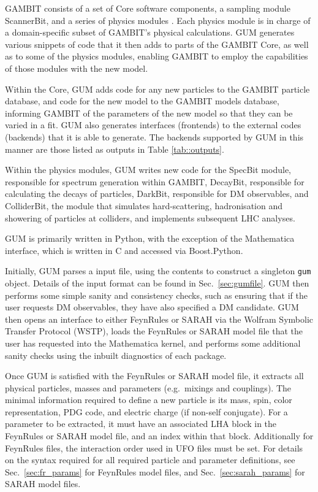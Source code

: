 \documentclass[pdftex,twocolumn,epjc3_preprint,runningheads]{svjour3}
\renewcommand{\_}{\discretionary{\underscore}{}{\underscore}}
\newcommand\term[1]{{\lstset{style=terminal}\lstinline!#1!\lstset{style=cpp}}}
\newcommand\py[1]{{\lstset{style=python}\lstinline!#1!\lstset{style=cpp}}}
\newcommand{\gambit}{\textsf{GAMBIT}\xspace}
\newcommand{\darkbit}{\textsf{DarkBit}\xspace}
\newcommand{\colliderbit}{\textsf{ColliderBit}\xspace}
\newcommand{\specbit}{\textsf{SpecBit}\xspace}
\newcommand{\decaybit}{\textsf{DecayBit}\xspace}
\newcommand{\scannerbit}{\textsf{ScannerBit}\xspace}
\newcommand{\GB}{\gambit}
\newcommand\Mathematica{\textsf{Mathematica}\xspace}
\newcommand{\gum}{\textsf{GUM}\xspace}
\newcommand{\dgum}{\!\!\term{.gum}\!\xspace}
\newcommand{\fr}{\textsf{FeynRules}\xspace}
\newcommand{\sarah}{\textsf{SARAH}\xspace}
\newcommand{\ufo}{\textsf{UFO}\xspace}
\newcommand\xx{\raisebox{0.2ex}{\smaller ++}\xspace}
\newcommand\Cpp{\textsf{C\xx}\xspace}
\newcommand\Python{\textsf{Python}\xspace}
\newcommand\python{\Python}
\begin{document}
\GB consists of a set of Core software components, a sampling module \scannerbit \cite{ScannerBit}, and a series of physics modules \cite{ColliderBit,DarkBit,SDPBit,FlavBit,RHN,CosmoBit}.  Each physics module is in charge of a domain-specific subset of \GB's physical calculations. \gum generates various snippets of code that it then adds to parts of the \GB Core, as well as to some of the physics modules, enabling \gambit to employ the capabilities of those modules with the new model.

Within the Core, \gum adds code for any new particles to the \GB particle database, and code for the new model to the \GB models database, informing \GB of the parameters of the new model so that they can be varied in a fit.  \gum also generates interfaces (frontends) to the external codes (backends) that it is able to generate. The backends supported by \gum in this manner are those listed as outputs in Table \ref{tab::outputs}.

Within the physics modules, \gum writes new code for the \specbit \cite{SDPBit} module, responsible for spectrum generation within \GB, \decaybit \cite{SDPBit}, responsible for calculating the decays of particles, \darkbit \cite{DarkBit}, responsible for DM observables, and \colliderbit \cite{ColliderBit}, the module that simulates hard-scattering, hadronisation and showering of particles at colliders, and implements subsequent LHC analyses.

\gum is primarily written in \python, with the exception of the \Mathematica interface, which is written in \Cpp and accessed via \textsf{Boost.Python}.

Initially, \gum parses a \dgum input file, using the contents to construct a singleton \py{gum} object.  Details of the input format can be found in Sec.~\ref{sec:gumfile}.  \gum then performs some simple sanity and consistency checks, such as ensuring that if the user requests DM observables, they have also specified a DM candidate. \gum then opens an interface to either \fr or \sarah via the Wolfram Symbolic Transfer Protocol (\textsf{WSTP}), loads the \fr or \sarah model file that the user has requested into the \Mathematica kernel, and performs some additional sanity checks using the inbuilt diagnostics of each package.

Once \gum is satisfied with the \fr or \sarah model file, it extracts all physical particles, masses and parameters (e.g.\ mixings and couplings). The minimal information required to define a new particle is its mass, spin, color representation, PDG code, and electric charge (if non-self conjugate). For a parameter to be extracted, it must have an associated LHA block in the \fr or \sarah model file, and an index within that block. Additionally for \fr files, the interaction order used in \ufo files must be set.  For details on the syntax required for all required particle and parameter definitions, see Sec.\ \ref{sec:fr_params} for \fr  model files, and Sec.\ \ref{sec:sarah_params} for \sarah model files.
\end{document}
